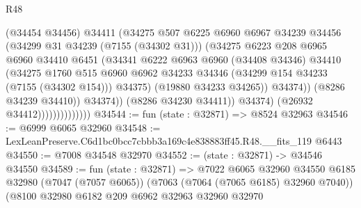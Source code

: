 \begin{lexlean}{R48}
\begin{coremodule}
                                        (@34454 @34456)
                                        @34411
                                        (@34275
                                          @507
                                          @6225
                                          @6960
                                          @6967
                                          @34239
                                          @34456
                                          (@34299 @31 @34239 (@7155 (@34302 @31)))
                                          (@34275
                                            @6223
                                            @208
                                            @6965
                                            @6960
                                            @34410
                                            @6451
                                            (@34341
                                              @6222
                                              @6963
                                              @6960
                                              (@34408 @34346)
                                              @34410
                                              (@34275
                                                @1760
                                                @515
                                                @6960
                                                @6962
                                                @34233
                                                @34346
                                                (@34299 @154 @34233 (@7155 (@34302 @154)))
                                                @34375)
                                              (@19880 @34233 @34265))
                                            @34374))
                                        (@8286 @34239 @34410))
                                      @34374))
                                  (@8286 @34230 @34411))
                                @34374)
                              (@26932 @34412))))))))))))))
@34544 := fun (state : @32871) => @8524 @32963
@34546 := @6999 @6065 @32960
@34548 := LexLeanPreserve.C6d1bc0bcc7cbbb3a169c4e838883ff45.R48.__fits_119 @6443
@34550 := @7008 @34548 @32970
@34552 := (state : @32871) -> @34546 @34550
@34589 := fun (state : @32871) =>
  @7022
    @6065
    @32960
    @34550
    @6185
    @32980
    (@7047 (@7057 @6065))
    (@7063 (@7064 (@7065 @6185) @32960 @7040))
    (@8100
      @32980
      @6182
      @209
      @6962
      @32963
      @32960
      @32970

\end{coremodule}
\end{lexlean}
